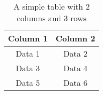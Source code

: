 \begin{table}[h]
    \centering
    \begin{tabular}{|c|c|}
        \hline
        Column 1 & Column 2 \\
        \hline
        Data 1 & Data 2 \\
        \hline
        Data 3 & Data 4 \\
        \hline
        Data 5 & Data 6 \\
        \hline
    \end{tabular}
    \caption{A simple table with 2 columns and 3 rows}
    \label{tab:example}
\end{table}